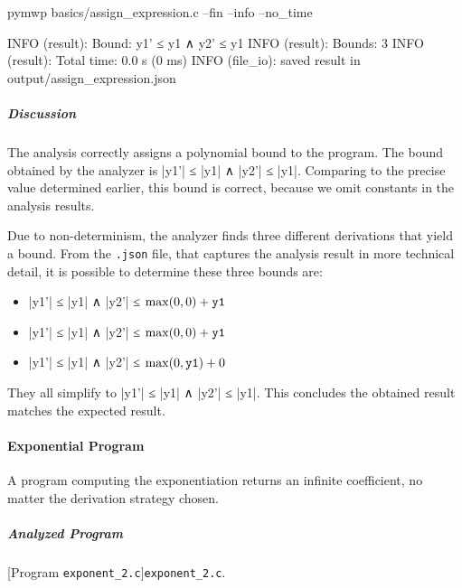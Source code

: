 \begin{cmdlisting}[label={lst:ex1-run}]
pymwp basics/assign_expression.c --fin --info --no_time
\end{cmdlisting}

\begin{outlisting}[label={lst:ex-output}]
INFO (result): Bound: y1' ≤ y1 ∧ y2' ≤ y1
INFO (result): Bounds: 3
INFO (result): Total time: 0.0 s (0 ms)
INFO (file_io): saved result in output/assign_expression.json
\end{outlisting}

\subparagraph*{Discussion}
The analysis correctly assigns a polynomial bound to the program.
The bound obtained by the analyzer is \pr|y1'| ≤ \pr|y1| ∧ \pr|y2'| ≤ \pr|y1|.
Comparing to the precise value determined earlier, this bound is correct, because we omit constants in the analysis results.

Due to non-determinism, the analyzer finds three different derivations that yield a bound.
From the \texttt{.json} file, that captures the analysis result in more technical detail, it is possible to determine these three bounds are:
\begin{itemize}
\item \pr|y1'| ≤ \pr|y1| ∧ \pr|y2'| ≤ \(\max(0,0) + \prm{y1}\)
\item \pr|y1'| ≤ \pr|y1| ∧ \pr|y2'| ≤ \(\max(0,0) + \prm{y1}\)
\item \pr|y1'| ≤ \pr|y1| ∧ \pr|y2'| ≤ \(\max(0,\prm{y1}) + 0\)
\end{itemize}
They all simplify to \pr|y1'| ≤ \pr|y1| ∧ \pr|y2'| ≤ \pr|y1|.
This concludes the obtained result matches the expected result.

\paragraph{Exponential Program}\label{exponential-program}
A program computing the exponentiation returns an infinite coefficient, no matter the derivation strategy chosen.

\subparagraph*{Analyzed Program}

\begin{center}
\begin{minipage}{\textwidth}
[Program \texttt{exponent\_2.c}]{\texttt{exponent\_2.c}.}
\label{lst:exponent2}
\end{minipage}
\end{center}

